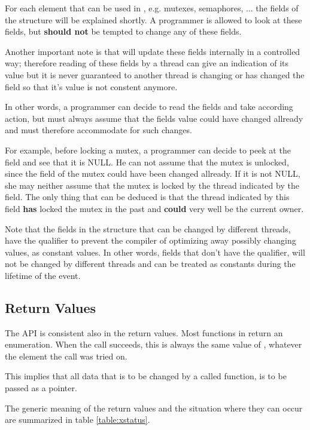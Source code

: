 For each element that can be used in \oswald, e.g. mutexes, semaphores, ... the
fields of the structure will be explained shortly. A programmer is allowed
to look at these fields, but \textbf{should not} be tempted to change any of
these fields.

Another important note is that \oswald will update these fields internally in
a controlled way; therefore reading of these fields by a thread can give an
indication of its value but it is never guaranteed to another thread is
changing or has changed the field so that it's value is not constent
anymore.

In other words, a programmer can decide to read the fields and take
according action, but must always assume that the fields value could
have changed allready and must therefore accommodate for such changes.

For example, before locking a mutex, a programmer can decide to peek at the
field  and see that it is NULL. He can
not assume that the mutex is unlocked, since the  field of the
mutex could have been changed allready. If it is not NULL, she may neither
assume that the mutex is locked by the thread indicated by the
 field. The only thing that can be
deduced is that the thread indicated by this field \textbf{has} locked the mutex in
the past and \textbf{could} very well be the current owner.

Note that the fields in the structure that can be changed by different
threads, have the qualifier  to prevent the compiler of
optimizing away possibly changing values, as constant values. In other
words, fields that don't have the  qualifier, will not be
changed by different threads and can be treated as constants during the
lifetime of the event.

\subsection{Return Values}

The API is consistent also in the return values. Most functions in \oswald return
an  enumeration. When the call succeeds, this is always the
same value of , whatever the element the call was tried on.

This implies that all data that is to be changed by a called function, is to
be passed as a pointer.

The generic meaning of the return values and the situation where they can occur are summarized 
in table \ref{table:xstatus}.


